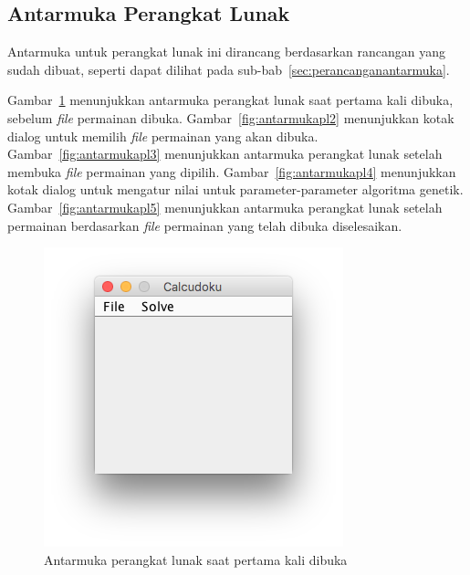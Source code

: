\subsection{Antarmuka Perangkat Lunak}
\label{sec:antarmukapl}

Antarmuka untuk perangkat lunak ini dirancang berdasarkan rancangan yang sudah dibuat, seperti dapat dilihat pada sub-bab~\ref{sec:perancanganantarmuka}.

Gambar~\ref{fig:antarmukapl1} menunjukkan antarmuka perangkat lunak saat pertama kali dibuka, sebelum \textit{file} permainan dibuka. Gambar~\ref{fig:antarmukapl2} menunjukkan kotak dialog untuk memilih \textit{file} permainan yang akan dibuka. Gambar~\ref{fig:antarmukapl3} menunjukkan antarmuka perangkat lunak setelah membuka \textit{file} permainan yang dipilih. Gambar~\ref{fig:antarmukapl4} menunjukkan kotak dialog untuk mengatur nilai untuk parameter-parameter algoritma genetik. Gambar~\ref{fig:antarmukapl5} menunjukkan antarmuka perangkat lunak setelah permainan berdasarkan \textit{file} permainan yang telah dibuka diselesaikan.

\begin{figure}
\centering
\captionsetup{justification=centering}
\includegraphics[scale=0.5]{Gambar/ImplementasiPengujian/Calcudoku1.png}
\caption[Antarmuka perangkat lunak saat pertama kali dibuka]{Antarmuka perangkat lunak saat pertama kali dibuka}
\label{fig:antarmukapl1}
\end{figure}

